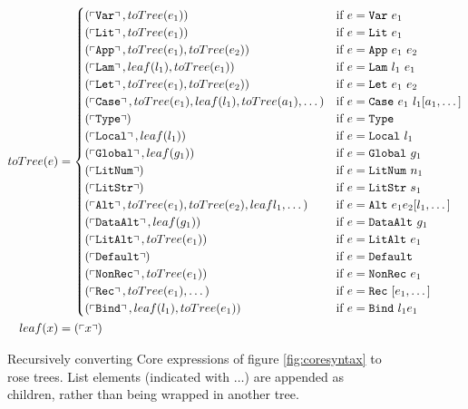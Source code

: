\begin{figure}
  \begin{align*}
    toTree(e) &=
    \begin{cases}
      (\feature{\CVar}, toTree(e_1))                                 & \text{if $e = \CVar\ e_1$} \\
      (\feature{\CLit}, toTree(e_1))                                 & \text{if $e = \CLit\ e_1$} \\
      (\feature{\CApp}, toTree(e_1), toTree(e_2))                    & \text{if $e = \CApp\ e_1\ e_2$} \\
      (\feature{\CLam}, leaf(l_1), toTree(e_1))                      & \text{if $e = \CLam\ l_1\ e_1$} \\
      (\feature{\CLet}, toTree(e_1), toTree(e_2))                    & \text{if $e = \CLet\ e_1\ e_2$} \\
      (\feature{\CCase}, toTree(e_1), leaf(l_1), toTree(a_1), \dots) & \text{if $e = \CCase\ e_1\ l_1 [a_1, \dots]$} \\
      (\feature{\CType})                                            & \text{if $e = \CType$} \\
      (\feature{\CLocal}, leaf(l_1))                                & \text{if $e = \CLocal\ l_1$} \\
      (\feature{\CGlobal}, leaf(g_1))                               & \text{if $e = \CGlobal\ g_1$} \\
      (\feature{\CLitNum})                                          & \text{if $e = \CLitNum\ n_1$} \\
      (\feature{\CLitStr})                                          & \text{if $e = \CLitStr\ s_1$} \\
      (\feature{\CAlt}, toTree(e_1), toTree(e_2), leaf{l_1}, \dots)  & \text{if $e = \CAlt\ e_1 e_2 [l_1, \dots]$}  \\
      (\feature{\CDataAlt}, leaf(g_1))                              & \text{if $e = \CDataAlt\ g_1$}  \\
      (\feature{\CLitAlt}, toTree(e_1))                             & \text{if $e = \CLitAlt\ e_1$}  \\
      (\feature{\CDefault})                                         & \text{if $e = \CDefault$}  \\
      (\feature{\CNonRec}, toTree(e_1))                             & \text{if $e = \CNonRec\ e_1$}  \\
      (\feature{\CRec}, toTree(e_1), \dots)                         & \text{if $e = \CRec\ [e_1, \dots]$} \\
      (\feature{\CBind}, leaf(l_1), toTree(e_1))                    & \text{if $e = \CBind\ l_1 e_1$}
    \end{cases} \\
    leaf(x) &= (\feature{x})
  \end{align*}
  \caption{Recursively converting Core expressions of figure \ref{fig:coresyntax} to rose trees. List elements (indicated with $\dots$) are appended as children, rather than being wrapped in another tree.}
  \label{fig:totree}
\end{figure}


